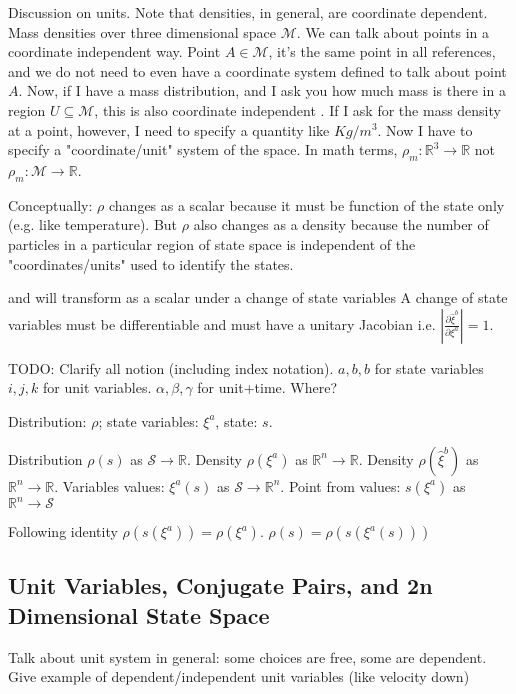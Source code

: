 \documentclass{article}
\begin{document}
Discussion on units. Note that densities, in general, are coordinate dependent. Mass densities over three dimensional space $\mathcal{M}$. We can talk about points in a coordinate independent way. Point $A \in \mathcal{M}$, it's the same point in all references, and we do not need to even have a coordinate system defined to talk about point $A$. Now, if I have a mass distribution, and I ask you how much mass is there in a region $U \subseteq \mathcal{M}$, this is also coordinate independent . If I ask for the mass density at a point, however, I need to specify a quantity like $Kg/m^3$. Now I have to specify a "coordinate/unit" system of the space. In math terms, $\rho_m : \mathbb{R}^3 \to \mathbb{R}$ not $\rho_m : \mathcal{M} \to \mathbb{R}$.

Conceptually: $\rho$ changes as a scalar because it must be function of the state only (e.g. like temperature). But $\rho$ also changes as a density because the number of particles in a particular region of state space is independent of the "coordinates/units" used to identify the states.

\begin{prop}
	 and will transform as a scalar under a change of state variables A change of state variables must be differentiable and must have a unitary Jacobian i.e. $\left|\frac{\partial\hat{\xi}^b}{\partial\xi^a}\right| = 1$.
\end{prop}

TODO: Clarify all notion (including index notation). $a, b, b$ for state variables $i, j, k$ for unit variables. $\alpha, \beta, \gamma$ for unit+time. Where?

Distribution: $\rho$; state variables: $\xi^a$, state: $s$.

Distribution $\rho(s)$ as $\mathcal{S} \to \mathbb{R}$.  Density $\rho(\xi^a)$ as $\mathbb{R}^n \to \mathbb{R}$.  Density $\rho(\hat{\xi}^b)$ as $\mathbb{R}^n \to \mathbb{R}$. Variables values: $\xi^a(s)$ as $\mathcal{S} \to \mathbb{R}^n$. Point from values: $s(\xi^a)$ as $\mathbb{R}^n \to \mathcal{S}$

Following identity $\rho(s(\xi^a)) = \rho(\xi^a)$. $\rho(s) = \rho(s (\xi^a(s)))$

\subsection{Unit Variables, Conjugate Pairs, and 2n Dimensional State Space}

Talk about unit system in general: some choices are free, some are dependent. Give example of dependent/independent unit variables (like velocity down)
\end{document}
